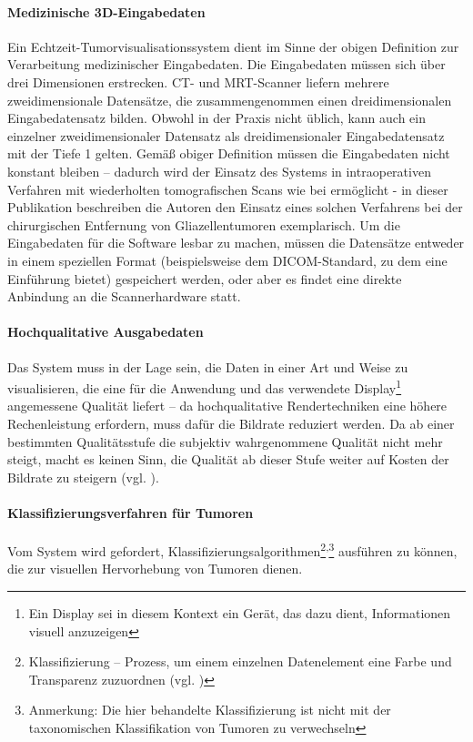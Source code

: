 \documentclass[ngerman,pdftex,paper=A4,DIV=calc,titlepage,12pt]{scrartcl}
\newtheorem[L]{boxedDefinition}{Definition}
\begin{document}
\paragraph{Medizinische 3D-Eingabedaten} Ein Echtzeit-Tumorvisualisationssystem dient im Sinne der obigen Definition zur Verarbeitung medizinischer Eingabedaten. Die Eingabedaten müssen sich über drei Dimensionen erstrecken. CT- und MRT-Scanner liefern mehrere zweidimensionale Datensätze, die zusammengenommen einen dreidimensionalen Eingabedatensatz bilden. Obwohl in der Praxis nicht üblich, kann auch ein einzelner zweidimensionaler Datensatz als dreidimensionaler Eingabedatensatz mit der Tiefe 1 gelten. Gemäß obiger Definition müssen die Eingabedaten nicht konstant bleiben -- dadurch wird der Einsatz des Systems in intraoperativen Verfahren mit wiederholten tomografischen Scans wie bei \cite{Okudera1994} ermöglicht - in dieser Publikation beschreiben die Autoren den Einsatz eines solchen Verfahrens bei der chirurgischen Entfernung von Gliazellentumoren exemplarisch. Um die Eingabedaten für die Software lesbar zu machen, müssen die Datensätze entweder in einem speziellen Format (beispielsweise dem DICOM-Standard, zu dem \cite{Mildenberger2002} eine Einführung bietet) gespeichert werden, oder aber es findet eine direkte Anbindung an die Scannerhardware statt.

\paragraph{Hochqualitative Ausgabedaten} Das System muss in der Lage sein, die Daten in einer Art und Weise zu visualisieren, die eine für die Anwendung und das verwendete Display\footnote{Ein Display sei in diesem Kontext ein Gerät, das dazu dient, Informationen visuell anzuzeigen} angemessene Qualität liefert -- da hochqualitative Rendertechniken eine höhere Rechenleistung erfordern, muss dafür die Bildrate reduziert werden. Da ab einer bestimmten Qualitätsstufe die subjektiv wahrgenommene Qualität nicht mehr steigt, macht es keinen Sinn, die Qualität ab dieser Stufe weiter auf Kosten der Bildrate zu steigern (vgl. \cite[Kapitel 3.3, Seite 5]{Kutter2008}).

\paragraph{Klassifizierungsverfahren für Tumoren}Vom System wird gefordert, Klassifizierungsalgorithmen\footnote{Klassifizierung -- Prozess, um einem einzelnen Datenelement eine Farbe und Transparenz zuzuordnen (vgl. \cite[Kapitel 3.2.2, Seite 28]{Bruckner2004})}\textsuperscript{,}\footnote{Anmerkung: Die hier behandelte Klassifizierung ist nicht mit der taxonomischen Klassifikation von Tumoren zu verwechseln} ausführen zu können, die zur visuellen Hervorhebung von Tumoren dienen.
\end{document}
